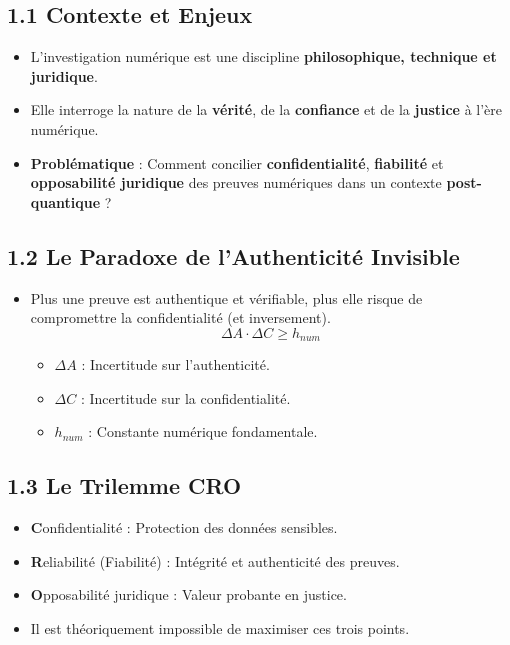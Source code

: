 \documentclass[12pt, a4paper]{report}
\begin{document}
\subsection*{1.1 Contexte et Enjeux}
\begin{itemize}
    \item L’investigation numérique est une discipline \textbf{philosophique, technique et juridique}.
    \item Elle interroge la nature de la \textbf{vérité}, de la \textbf{confiance} et de la \textbf{justice} à l’ère numérique.
    \item \textbf{Problématique} : Comment concilier \textbf{confidentialité}, \textbf{fiabilité} et \textbf{opposabilité juridique} des preuves numériques dans un contexte \textbf{post-quantique} ?
\end{itemize}

\subsection*{1.2 Le Paradoxe de l’Authenticité Invisible}
\begin{itemize}
    \item Plus une preuve est authentique et vérifiable, plus elle risque de compromettre la confidentialité (et inversement).
    \[
    \Delta A \cdot \Delta C \geq h_{num}
    \]
    \begin{itemize}
        \item \(\Delta A\) : Incertitude sur l’authenticité.
        \item \(\Delta C\) : Incertitude sur la confidentialité.
        \item \(h_{num}\) : Constante numérique fondamentale.
    \end{itemize}
\end{itemize}

\subsection*{1.3 Le Trilemme CRO}
\begin{itemize}
    \item \textbf{C}onfidentialité : Protection des données sensibles.
    \item \textbf{R}eliabilité (Fiabilité) : Intégrité et authenticité des preuves.
    \item \textbf{O}pposabilité juridique : Valeur probante en justice.
    \item Il est théoriquement impossible de maximiser ces trois points.
\end{itemize}
\end{document}
